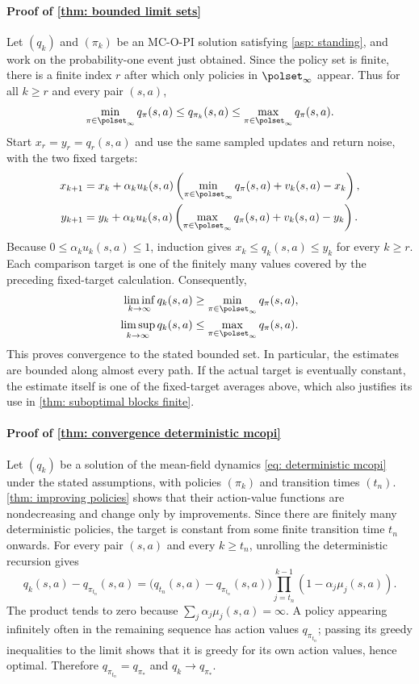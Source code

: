 \paragraph{Proof of \autoref{thm: bounded limit sets}}
Let $(q_k)$ and $(\pi_k)$ be an MC-O-PI solution satisfying \autoref{asp: standing}, and work on the probability-one event just obtained. Since the policy set is finite, there is a finite index $r$ after which only policies in $\polset_\infty$ appear.
Thus for all $k\ge r$ and every pair $(s,a)$,
\[
\min_{\pi\in\polset_\infty}q_\pi(s,a)
\le q_{\pi_k}(s,a)
\le\max_{\pi\in\polset_\infty}q_\pi(s,a).
\]
Start $x_r=y_r=q_r(s,a)$ and use the same sampled updates and return noise, with the two fixed targets:
\begin{align*}
x_{k+1}&=x_k+\alpha_k u_k(s,a)
\left(\min_{\pi\in\polset_\infty}q_\pi(s,a)+v_k(s,a)-x_k\right),\\
y_{k+1}&=y_k+\alpha_k u_k(s,a)
\left(\max_{\pi\in\polset_\infty}q_\pi(s,a)+v_k(s,a)-y_k\right).
\end{align*}
Because $0\le\alpha_k u_k(s,a)\le1$, induction gives $x_k\le q_k(s,a)\le y_k$ for every $k\ge r$.
Each comparison target is one of the finitely many values covered by the preceding fixed-target calculation. Consequently,
\begin{align*}
\liminf_{k\to\infty}q_k(s,a)&\ge\min_{\pi\in\polset_\infty}q_\pi(s,a),\\
\limsup_{k\to\infty}q_k(s,a)&\le\max_{\pi\in\polset_\infty}q_\pi(s,a).
\end{align*}
This proves convergence to the stated bounded set. In particular, the estimates are bounded along almost every path. If the actual target is eventually constant, the estimate itself is one of the fixed-target averages above, which also justifies its use in \autoref{thm: suboptimal blocks finite}.
\hfill\BlackBox

\paragraph{Proof of \autoref{thm: convergence deterministic mcopi}}
Let $(q_k)$ be a solution of the mean-field dynamics \eqref{eq: deterministic mcopi} under the stated assumptions, with policies $(\pi_k)$ and transition times $(t_n)$.
\autoref{thm: improving policies} shows that their action-value functions are nondecreasing and change only by improvements. Since there are finitely many deterministic policies, the target is constant from some finite transition time $t_n$ onwards.
For every pair $(s,a)$ and every $k\ge t_n$, unrolling the deterministic recursion gives
\[
q_k(s,a)-q_{\pi_{t_n}}(s,a)
=\big(q_{t_n}(s,a)-q_{\pi_{t_n}}(s,a)\big)
\prod_{j=t_n}^{k-1}(1-\alpha_j\mu_j(s,a)).
\]
The product tends to zero because $\sum_j\alpha_j\mu_j(s,a)=\infty$.
A policy appearing infinitely often in the remaining sequence has action values $q_{\pi_{t_n}}$; passing its greedy inequalities to the limit shows that it is greedy for its own action values, hence optimal. Therefore $q_{\pi_{t_n}}=q_{\pi_*}$ and $q_k\to q_{\pi_*}$.
\hfill\BlackBox

